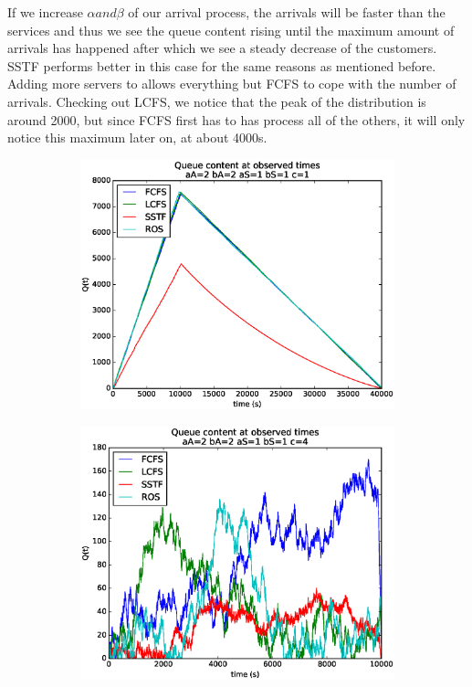 \documentclass[a4paper]{article}
\begin{document}
If we increase  $\alpha and \beta$ of our arrival process, the arrivals will be faster than the services and thus we see the queue content rising until the maximum amount of arrivals has happened after which we see a steady decrease of the customers. SSTF performs better in this case for the same reasons as mentioned before. Adding more servers to allows everything but FCFS to cope with the number of arrivals.
Checking out LCFS, we notice that the peak of the distribution is around 2000, but since FCFS first has to has process all of the others, it will only notice this maximum later on, at about 4000s.
\begin{figure}[H]
\begin{subfigure}{.5\textwidth}
  \centering
  \includegraphics[width=\linewidth]{../figures/queue_content22111}
  \label{fig:qcaa}
\end{subfigure}
\begin{subfigure}{.5\textwidth}
  \centering
  \includegraphics[width=\linewidth]{../figures/queue_content22114}
  \label{fig:qcaaa}
\end{subfigure}
\end{figure}
\end{document}
